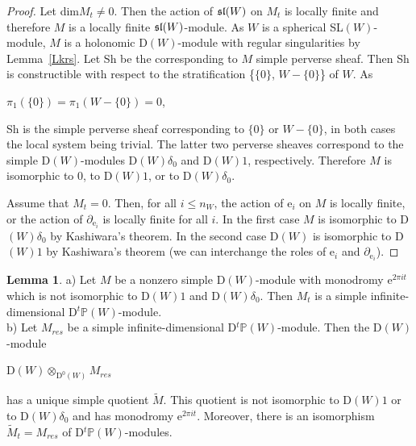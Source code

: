 \documentclass[12pt]{amsart}
\theoremstyle{definition}\newtheorem{theorem}{Theorem}[section]
\newtheorem{lemma}[proposition]{Lemma}
\theoremstyle{definition}\newtheorem{definition}[proposition]{Definition}
\theoremstyle{remark}\newtheorem{example}[proposition]{Example}
\begin{document}
\begin{proof}Let dim$M_t\ne0$. Then the action of $\frak{sl}(W)$ on $M_t$ is locally finite and therefore $M$ is a locally finite $\frak{sl}(W)$-module. As $W$ is a spherical SL$(W)$-module, $M$ is a holonomic D$(W)$-module with regular singularities by Lemma~\ref{Lkrs}. Let Sh be the corresponding to $M$ simple perverse sheaf. Then Sh is constructible with respect to the stratification \{$\{0\}$, $W-\{0\}$\} of $W$. As \begin{center}$\pi_1(\{0\})=\pi_1(W-\{0\})=0$,\end{center} Sh is the simple perverse sheaf corresponding to $\{0\}$ or $W-\{0\}$, in both cases the local system being trivial. The latter two perverse sheaves correspond to the simple D$(W)$-modules D$(W)\delta_0$ and D$(W)1$, respectively. Therefore $M$ is isomorphic to 0, to D$(W)1$, or to D$(W)\delta_0$.

Assume that $M_t=0$. Then, for all $i\le n_W$, the action of e$_i$ on $M$ is locally finite, or the action of $\partial_{\mathrm e_i}$ is locally finite for all $i$. In the first case $M$ is isomorphic to D$(W)\delta_0$ by Kashiwara's theorem. In the second case D$(W)$ is isomorphic to D$(W)1$ by Kashiwara's theorem (we can interchange the roles of e$_i$ and $\partial_{\mathrm e_i}$).\end{proof}
\begin{lemma}\label{Ldtpw}a) Let $M$ be a nonzero simple D$(W)$-module with monodromy e$^{2\pi it}$ which is not isomorphic to D$(W)1$ and D$(W)\delta_0$. Then $M_t$ is a simple infinite-dimensional D$^t\mathbb P(W)$-module.\\b) Let $M_{res}$ be a simple infinite-dimensional D$^t\mathbb P(W)$-module. Then the D$(W)$-module \begin{center}D$(W)\otimes_{\mathrm D^0(W)}M_{res}$\end{center} has a unique simple quotient $\tilde M$. This quotient is not isomorphic to D$(W)1$ or to D$(W)\delta_0$ and has monodromy e$^{2\pi it}$. Moreover, there is an isomorphism $\tilde M_t=M_{res}$ of D$^t\mathbb P(W)$-modules.\end{lemma}
\end{document}
